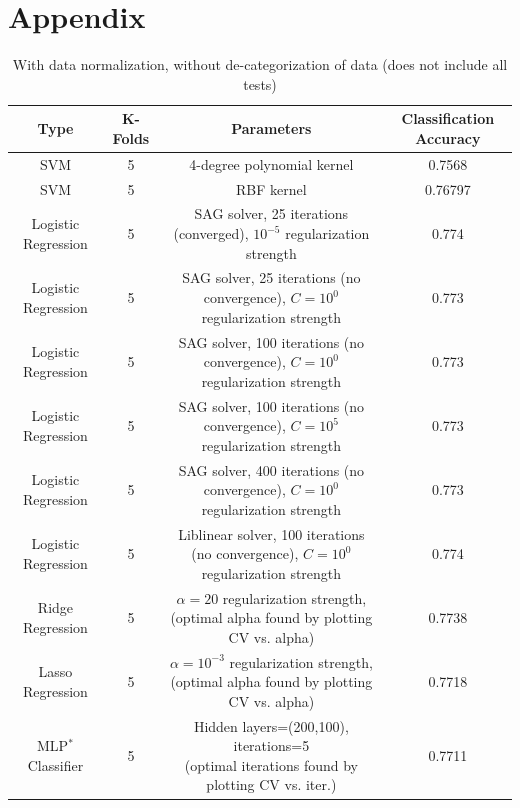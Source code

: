 \section{Appendix}

\def\arraystretch{1.1}%
\begin{longtable}{c|c|c|c}
\caption{With data normalization, without de-categorization of data (does not include all tests)}\\\hline
Type & K-Folds & Parameters & Classification Accuracy \\\hline
SVM & 5 & 4-degree polynomial kernel & 0.7568 \\\hline
SVM & 5 & RBF kernel & 0.76797 \\\hline
Logistic Regression & 5 & \makecell*{SAG solver, 25 iterations (converged),\\ $10^{-5}$ regularization strength} & 0.774 \\\hline
Logistic Regression & 5 & \makecell*{SAG solver, 25 iterations (no \\convergence), $C=10^{0}$ regularization strength} & 0.773 \\\hline
Logistic Regression & 5 & \makecell*{SAG solver, 100 iterations (no \\convergence), $C=10^{0}$ regularization strength} & 0.773 \\\hline
Logistic Regression & 5 & \makecell*{SAG solver, 100 iterations (no \\convergence), $C=10^{5}$ regularization strength} & 0.773 \\\hline
Logistic Regression & 5 & \makecell*{SAG solver, 400 iterations (no \\convergence), $C=10^{0}$ regularization strength} & 0.773 \\\hline
Logistic Regression & 5 & \makecell*{Liblinear solver, 100 iterations (no \\convergence), $C=10^{0}$ regularization strength} & 0.774 \\\hline
Ridge Regression & 5 & \makecell*{$\alpha=20$ regularization strength,\\ (optimal alpha found by plotting CV vs. alpha)} & 0.7738 \\\hline
Lasso Regression & 5 & \makecell*{$\alpha=10^{-3}$ regularization strength,\\ (optimal alpha found by plotting CV vs. alpha)} & 0.7718 \\\hline
MLP$^{*}$ Classifier & 5 & \makecell*{Hidden layers=(200,100), iterations=5 \\ (optimal iterations found by plotting CV vs. iter.)} & 0.7711 \\\hline

\end{longtable}
